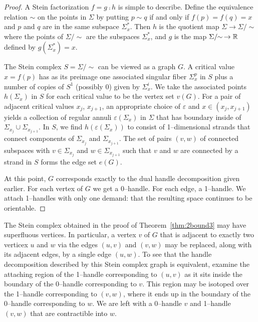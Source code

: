 \begin{proof}
	A Stein factorization $f=g\comp h$ is simple to describe.
	Define the equivalence relation $\sim$ on the points in $\Sigma$ by putting $p\sim q$ if and only if $f(p)=f(q)=x$ and $p$ and $q$ are in the same subspace $\Sigma_x^*$.
	Then $h$ is the quotient map $\Sigma\to \Sigma/\!\!\sim$ where the points of $\Sigma/\!\!\sim$ are the subspaces $\Sigma_x^*$, and $g$ is the map $\Sigma/\!\!\sim\, \to\mathbb{R}$ defined by $g(\Sigma_x^*)=x$.

	The Stein complex $S=\Sigma/\!\!\sim$ can be viewed as a graph $G$.
	A critical value $x=f(p)$ has as its preimage one associated singular fiber $\Sigma_x^p$ in $S$ plus a number of copies of $S^1$ (possibly 0) given by $\Sigma_x^i$.
	We take the associated points $h(\Sigma_x)$ in $S$ for each critical value to be the vertex set $v(G)$.
	For a pair of adjacent critical values $x_{j}$, $x_{j+1}$, an appropriate choice of $\varepsilon$ and $x\in(x_{j},x_{j+1})$ yields a collection of regular annuli $\varepsilon(\Sigma_x)$ in $\Sigma$ that has boundary inside of $\Sigma_{x_{j}}\cup\Sigma_{x_{j+1}}$.
	In $S$, we find $h(\varepsilon(\Sigma_x))$ to consist of 1--dimensional strands that connect components of $\Sigma_{x_{j}}$ and $\Sigma_{x_{j+1}}$.
	The set of pairs $(v,w)$ of connected subspaces with $v\in\Sigma_{x_{j}}$ and $w\in\Sigma_{x_{j+1}}$ such that $v$ and $w$ are connected by a strand in $S$ forms the edge set $e(G)$.
	
	At this point, $G$ corresponds exactly to the dual handle decomposition given earlier.
	For each vertex of $G$ we get a 0--handle.
	For each edge, a 1--handle.
	We attach 1--handles with only one demand: that the resulting space continues to be orientable.
\end{proof}

The Stein complex obtained in the proof of Theorem~\ref{thm:2bound3} may have superfluous vertices.
In particular, a vertex $v$ of $G$ that is adjacent to exactly two verticex $u$ and $w$ via the edges $(u,v)$ and $(v,w)$ may be replaced, along with its adjacent edges, by a single edge $(u,w)$.
To see that the handle decomposition described by this Stein complex graph is equivalent, examine the attaching region of the 1--handle corresponding to $(u,v)$ as it sits inside the boundary of the 0--handle corresponding to $v$.
This region may be isotoped over the 1--handle corresponding to $(v,w)$, where it ends up in the boundary of the 0--handle corresponding to $w$.
We are left with a 0--handle $v$ and 1--handle $(v,w)$ that are contractible into $w$.